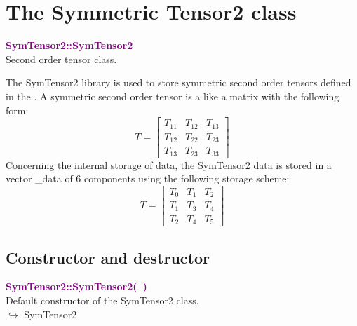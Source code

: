 \section{The Symmetric Tensor2 class}

\textcolor{purple}{\textbf{SymTensor2::SymTensor2}}\label{SymTensor2::SymTensor2}\\
Second order tensor class.

The SymTensor2 library is used to store symmetric second order tensors defined in the \DynELA. A symmetric second order tensor is a like a matrix with the following form:
\begin{equation*}
T=\left[\begin{array}{ccc}
  T_{11} & T_{12} & T_{13}\\
  T_{12} & T_{22} & T_{23}\\
  T_{13} & T_{23} & T_{33}
  \end{array}\right]
\end{equation*}
Concerning the internal storage of data, the SymTensor2 data is stored in a vector \_data of 6 components using the following storage scheme:
\begin{equation*}
T=\left[\begin{array}{ccc}
    T_{0} & T_{1} & T_{2}\\
    T_{1} & T_{3} & T_{4}\\
    T_{2} & T_{4} & T_{5}
    \end{array}\right]
\end{equation*}

\subsection{Constructor and destructor}

\textcolor{purple}{\textbf{SymTensor2::SymTensor2(~)}}\label{SymTensor2::SymTensor2()}\\
Default constructor of the SymTensor2 class.\\ \hspace*{10mm}$\hookrightarrow$ SymTensor2

